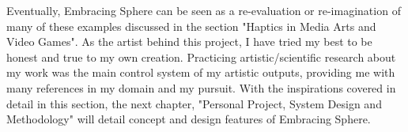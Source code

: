                 Eventually, Embracing Sphere can be seen as a re-evaluation or re-imagination of many of these examples discussed in the section "Haptics in Media Arts and Video Games". As the artist behind this project, I have tried my best to be honest and true to my own creation. Practicing artistic/scientific research about my work was the main control system of my artistic outputs, providing me with many references in my domain and my pursuit. With the inspirations covered in detail in this section, the next chapter, "Personal Project, System Design and Methodology" will detail concept and design features of Embracing Sphere.\par